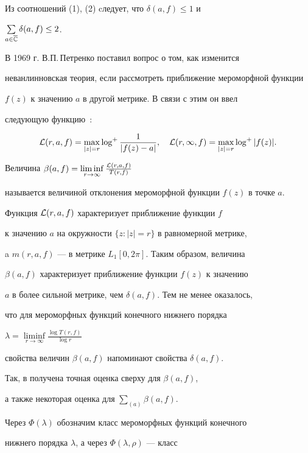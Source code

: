 Из соотношений (1), (2) cледует, что $\delta(a,f)\le 1$ и


$\sum\limits_{a\in\overline{\Bbb C}} \delta(a,f)\le 2$.





В 1969 г. В.П.\,Петренко поставил вопрос о том, как изменится 


неванлинновская теория, если рассмотреть приближение мероморфной функции


$f(z)$ к значению $a$ в другой метрике. В связи с этим он ввел 


следующую функцию~: 


$$


{ \cal L} (r,a,f)=\max_{|z|=r} \log^{+} \frac{1}{|f(z)-a|},


\quad


{\cal L} (r,\infty,f)=\max_{|z|=r} \log^{+}|f(z)|.


$$


Величина $\beta (a,f)= \liminf\limits_{r\to \infty}


\frac{{\cal L}(r,a,f)}{T(r,f)}$


называется величиной отклонения мероморфной функции $f(z)$ в точке $a$.





Функция ${ \cal L} (r,a,f)$ характеризует приближение функции $f$


к значению $a$ на окружности $\{z:|z|=r\}$ в равномерной метрике,


a $m(r,a,f)$ --- в метрике $L_{1}[0,2\pi]$. Таким образом, величина


$\beta(a,f)$ характеризует приближение функции $f(z)$ к значению


$a$ в более сильной метрике, чем $\delta(a,f)$. Тем не менее оказалось,


что для мероморфных функций конечного нижнего порядка


$\lambda=\liminf\limits_{r\to \infty}\frac{\log T(r,f)}{\log r}$


свойства величин $\beta(a,f)$ напоминают свойства $\delta(a,f)$.


Так, в \cite{3} получена точная оценка сверху для $\beta(a,f)$,


а также некоторая оценка для $\sum\limits_{(a)} \beta(a,f)$.


Через $\Phi(\lambda)$ обозначим класс мероморфных функций конечного 


нижнего порядка $\lambda$, а через $\Phi(\lambda, \rho)$ --- класс 


